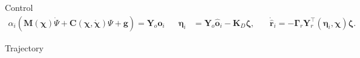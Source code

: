 \begin{frame}{Control}
\begin{align*}
                \alpha _i \left(\mathbf {M}(\boldsymbol{\chi})\dot{\Psi} + \mathbf {C}(\boldsymbol{\chi},\dot{\boldsymbol{\chi}})\Psi + \mathbf {g} \right) = \mathbf{Y}_o\mathbf{o}_i &&\boldsymbol{\eta}_i &= \mathbf{Y}_o\hat{\mathbf{o}}_i - \mathbf{K}_D\boldsymbol{\zeta}, &&\,\dot{\hat{\mathbf{r}}}_i = -\boldsymbol{\Gamma}_r\mathbf{Y}^\top_r\left(\boldsymbol{\eta}_i, \boldsymbol{\chi}\right)\boldsymbol{\zeta}.
            \end{align*}
                
    
\end{frame}

\begin{frame}{Trajectory}
    \begin{figure}[ht!]
        \centering
        \quad
    \end{figure}
\end{frame}


